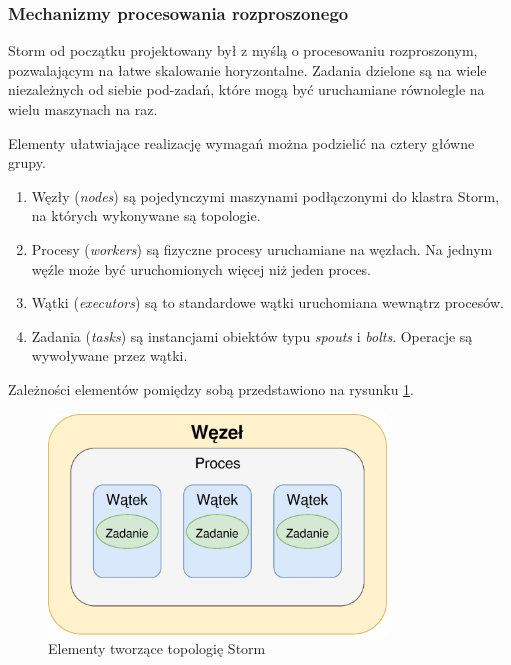 \subsubsection*{Mechanizmy procesowania rozproszonego}
Storm od początku projektowany był z myślą o procesowaniu rozproszonym,
pozwalającym na łatwe skalowanie horyzontalne.
Zadania dzielone są na wiele niezależnych od siebie pod-zadań,
które mogą być uruchamiane równolegle na wielu maszynach na raz.

Elementy ułatwiające realizację wymagań można podzielić na cztery główne grupy.
\begin{enumerate}
  \item Węzły (\textit{nodes}) są pojedynczymi maszynami podłączonymi do klastra Storm,
  na których wykonywane są topologie.
  \item Procesy (\textit{workers}) są fizyczne procesy uruchamiane na węzłach.
  Na jednym węźle może być uruchomionych więcej niż jeden proces.
  \item Wątki (\textit{executors}) są to standardowe wątki uruchomiana wewnątrz procesów.
  \item Zadania (\textit{tasks}) są instancjami obiektów typu \textit{spouts} i \textit{bolts}.
  Operacje są wywoływane przez wątki.
\end{enumerate}
Zależności elementów pomiędzy sobą przedstawiono na rysunku \ref{fig:StormParallel}.
\begin{figure}[htbp]
  \centering
  \includegraphics[width=0.8\textwidth]{img/stormElements}
  \caption{Elementy tworzące topologię Storm}
  \label{fig:StormParallel}
\end{figure}

